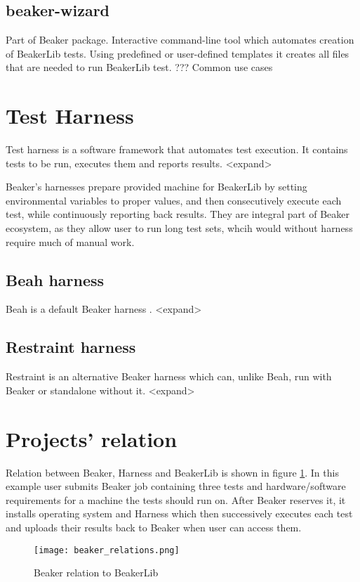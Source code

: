 \subsection{beaker-wizard}
Part of Beaker package. Interactive command-line tool which automates creation of BeakerLib tests. Using predefined or user-defined templates it creates all files that are needed to run BeakerLib test. 
???  Common use cases

\section{Test Harness}
Test harness is a software framework that automates test execution. It contains tests to be run, executes them and reports results. <expand>

Beaker’s harnesses prepare provided machine for BeakerLib by setting environmental variables to proper values, and then consecutively execute each test, while continuously reporting back results. They are integral part of Beaker ecosystem, as they allow user to run long test sets, whcih would without harness require much of manual work.

\subsection{Beah harness}
Beah \cite{beah_doc} is a default Beaker harness . <expand> 

\subsection{Restraint harness}
Restraint \cite{restraint_doc} is an alternative Beaker harness which can, unlike Beah, run with Beaker or standalone without it. <expand>

\section{Projects' relation}
Relation between Beaker, Harness and BeakerLib is shown in figure \ref{fig:beaker_relation}. In this example user submits Beaker job containing three tests and hardware/software requirements for a machine the tests should run on. After Beaker reserves it, it installs operating system and Harness which then successively executes each test and uploads their results back to Beaker when user can access them.

\begin{figure}
  \texttt{[image: beaker\_relations.png]}
  \caption{Beaker relation to BeakerLib}
  \label{fig:beaker_relation}
\end{figure}

